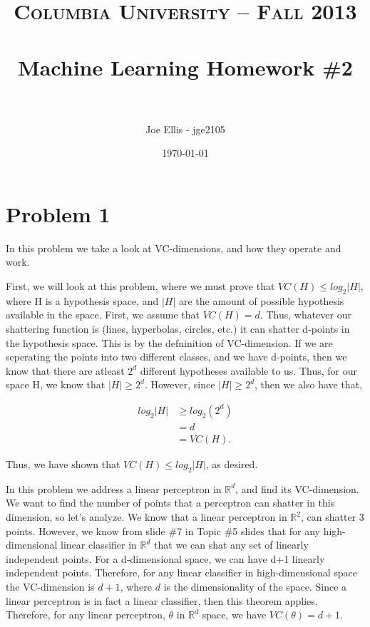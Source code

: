 \documentclass[paper=a4, fontsize=11pt]{scrartcl} %
\title{	
\normalfont \normalsize 
\textsc{Columbia University -- Fall 2013} \\ [25pt] %
\horrule{0.5pt} \\[0.4cm] %
\huge Machine Learning Homework \#2\\ %
\horrule{2pt} \\[0.5cm] %
}
\author{Joe Ellis - jge2105} %
\date{\normalsize\today} %
\begin{document}
\maketitle %


\section{Problem 1}

In this problem we take a look at VC-dimensions, and how they operate and work.

First, we will look at this problem, where we must prove that $VC(H) \leq log_2|H|$, where H is a hypothesis space, and $|H|$ are the amount of possible hypothesis available in the space.  First, we assume that $VC(H) = d$.  Thus, whatever our shattering function is (lines, hyperbolas, circles, etc.) it can shatter d-points in the hypothesis space.  This is by the defninition of VC-dimension.  If we are seperating the points into two different classes, and we have d-points, then we know that there are atleast $2^d$ different hypotheses available to us.  Thus, for our space H, we know that $|H| \geq 2^d$.  However, since $|H| \geq 2^d$, then we also have that,

\begin{align}
log_2|H| &\geq log_2(2^d) \\
&= d \\
&= VC(H).
\end{align}

Thus, we have  shown that $VC(H) \leq log_2|H|$, as desired.

In this problem we address a linear perceptron in $\mathbb{R}^d$, and find its VC-dimension.  We want to find the number of points that a perceptron can shatter in this dimension, so let's analyze.  We know that a linear perceptron in $\mathbb{R}^2$, can shatter 3 points.  However, we know from slide \#7 in Topic \#5 slides that for any high-dimensional linear classifier in $\mathbb{R}^d$ that we can shat any set of linearly independent points.  For a d-dimensional space, we can have d+1 linearly independent points.  Therefore, for any linear classifier in high-dimensional space the VC-dimension is $d+1$, where $d$ is the dimensionality of the space.  Since a linear perceptron is in fact a linear classifier, then this theorem applies.  Therefore, for any linear perceptron, $\theta$ in $\mathbb{R}^d$ space, we have $VC(\theta) = d + 1$.
\end{document}
